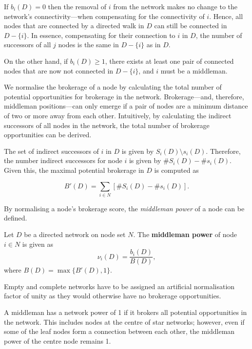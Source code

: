 If $b_{i}(D) = 0$ then the removal of $i$ from the network makes no change to the network's connectivity---when compensating for the connectivity of $i$. Hence, all nodes that are connected by a directed walk in $D$ can still be connected in $D - \{i\}$. In essence, compensating for their connection to $i$ in $D$, the number of successors of all $j$ nodes is the same in $D - \{i\}$ as in $D$.

On the other hand, if $b_{i}(D) \geqslant 1$, there exists at least one pair of connected nodes that are now not connected in $D - \{i\}$, and $i$ must be a middleman.

\medskip\noindent We normalise the brokerage of a node by calculating the total number of potential opportunities for brokerage in the network. Brokerage---and, therefore, middleman positions---can only emerge if a pair of nodes are a minimum distance of two or more away from each other. Intuitively, by calculating the indirect successors of all nodes in the network, the total number of brokerage opportunities can be derived.

The set of indirect successors of $i$ in $D$ is given by $S_{i}(D) \setminus s_{i}(D)$. Therefore, the number indirect successors for node $i$ is given by $\# S_{i}(D) - \# s_{i}(D)$. Given this, the maximal potential brokerage in $D$ is computed as

\begin{equation} \label{normalisation}
B'(D) = \sum_{i \in N} \left[ \# S_{i}(D) - \# s_{i}(D) \right] .
\end{equation}

By normalising a node's brokerage score, the \emph{middleman power} of a node can be defined.

\begin{definition} \label{middlemanpower}
Let $D$ be a directed network on node set $N$. The \textbf{middleman power} of node $i \in N$ is given as
\begin{equation} \label{mmpowerindex}
\nu_{i}(D) = \frac{b_{i}(D)}{B(D)} ,
\end{equation}
where $B(D) = \max \{ B'(D) , 1\}$.
\end{definition}

Empty and complete networks have to be assigned an artificial normalisation factor of unity as they would otherwise have no brokerage opportunities. 

A middleman has a network power of 1 if it brokers all potential opportunities in the network. This includes nodes at the centre of star networks; however, even if some of the leaf nodes form a connection between each other, the middleman power of the centre node remains 1.

